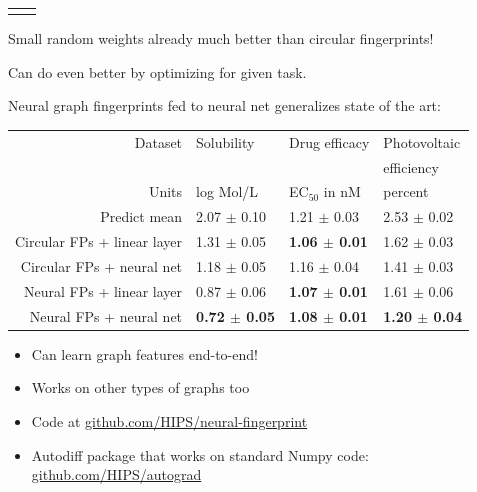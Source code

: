 \documentclass[landscape,a0b,final,a4resizeable]{include/a0poster}
\begin{document}
\begin{poster}
\begin{multicols}{3}
\begin{tabular}{cc}
\begin{minipage}[c]{0.48\columnwidth}
\begin{center}
\end{center}
\end{minipage}
\end{tabular}

\vspace{0.5em}

Small random weights already much better than circular fingerprints!

Can do even better by optimizing for given task.

\vspace{1in}


Neural graph fingerprints fed to neural net generalizes state of the art:%

\vspace{0.5em}

\begin{center}
\begin{tabular}{r|lll}
Dataset                      &   Solubility  & Drug efficacy & Photovoltaic \\
 & & & efficiency \\
\midrule
Units                        &   log Mol/L                            & EC$_{50}$ in nM                        & percent \\
\midrule
Predict mean                 & 2.07 $\pm$ 0.10        & 1.21 $\pm$ 0.03         & 2.53 $\pm$ 0.02 \\
Circular FPs + linear layer  & 1.31 $\pm$ 0.05        & \bf{1.06} $\pm$ 0.01    & 1.62 $\pm$ 0.03 \\
Circular FPs + neural net    & 1.18 $\pm$ 0.05        & 1.16 $\pm$ 0.04         & 1.41 $\pm$ 0.03 \\ 
Neural FPs + linear layer    & 0.87 $\pm$ 0.06        & \bf{1.07} $\pm$ 0.01    & 1.61 $\pm$ 0.06 \\  
Neural FPs + neural net      & \bf{0.72} $\pm$ 0.05   & \bf{1.08} $\pm$ 0.01    & \bf{1.20} $\pm$ 0.04
\end{tabular}

\vspace{0.5em}


\end{center}

\vspace{0.5em}


\begin{itemize}
\item Can learn graph features end-to-end!
\item Works on other types of graphs too 
\item Code at \url{github.com/HIPS/neural-fingerprint}
\item Autodiff package that works on standard Numpy code:\\ \url{github.com/HIPS/autograd}
\end{itemize}




\end{multicols}
\end{poster}
\end{document}
